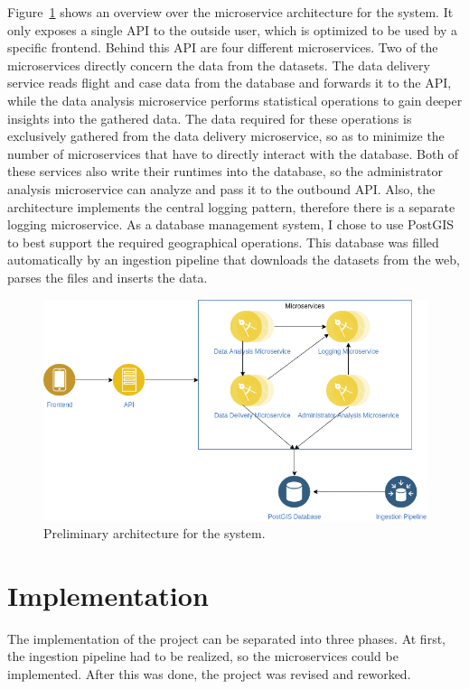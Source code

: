 \documentclass[11pt]{article}
\begin{document}
	Figure~\ref{fig:architecture} shows an overview over the microservice architecture for the system. It only exposes a single API to the outside user, which is optimized to be used by a specific frontend. Behind this API are four different microservices. Two of the microservices directly concern the data from the datasets. The data delivery service reads flight and case data from the database and forwards it to the API, while the data analysis microservice performs statistical operations to gain deeper insights into the gathered data. The data required for these operations is exclusively gathered from the data delivery microservice, so as to minimize the number of microservices that have to directly interact with the database. Both of these services also write their runtimes into the database, so the administrator analysis microservice can analyze and pass it to the outbound API. Also, the architecture implements the central logging pattern, therefore there is a separate logging microservice. As a database management system, I chose to use PostGIS to best support the required geographical operations. This database was filled automatically by an ingestion pipeline that downloads the datasets from the web, parses the files and inserts the data.
	
	\begin{figure}[h!]
		\centering
		\includegraphics[scale=0.38]{architecture.png}
		\caption{Preliminary architecture for the system.}
		\label{fig:architecture}
	\end{figure}

	\section{Implementation}
	
	The implementation of the project can be separated into three phases. At first, the ingestion pipeline had to be realized, so the microservices could be implemented. After this was done, the project was revised and reworked.
	
\end{document}
